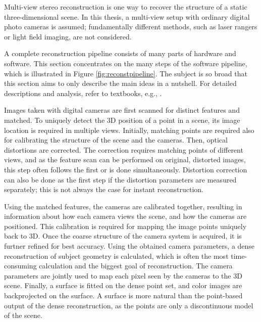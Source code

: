 Multi-view stereo reconstruction is one way to recover the structure of a static three-dimensional scene.
In this thesis, a multi-view setup with ordinary digital photo cameras is assumed;
fundamentally different methods, such as laser rangers or light field imaging, are not considered.

A complete reconstruction pipeline consists of many parts of hardware and software.
This section concentrates on the many steps of the software pipeline, which is illustrated in Figure \ref{fig:reconstpipeline}.
The subject is so broad that this section aims to only describe the main ideas in a nutshell.
For detailed descriptions and analysis, refer to textbooks, e.g., \cite{hartley03multiview,heyden2005multiple,szeliski10vision}.

Images taken with digital cameras are first scanned for distinct features and matched.
To uniquely detect the 3D position of a point in a scene, its image location is required in multiple views.
Initially, matching points are required also for calibrating the structure of the scene and the cameras.
Then, optical distortions are corrected.
The correction requires matching points of different views, and as the feature scan can be performed on original, distorted images, this step often follows the first or is done simultaneously.
Distortion correction can also be done as the first step if the distortion parameters are measured separately; this is not always the case for instant reconstruction.

Using the matched features, the cameras are calibrated together, resulting in information about how each camera views the scene, and how the cameras are positioned.
This calibration is required for mapping the image points uniquely back to 3D.
Once the coarse structure of the camera system is acquired, it is furtner refined for best accuracy.
Using the obtained camera parameters, a dense reconstruction of subject geometry is calculated, which is often the most time-consuming calculation and the biggest goal of reconstruction.
The camera parameters are jointly used to map each pixel seen by the cameras to the 3D scene.
Finally, a surface is fitted on the dense point set, and color images are backprojected on the surface.
A surface is more natural than the point-based output of the dense reconstruction, as the points are only a discontinuous model of the scene.


